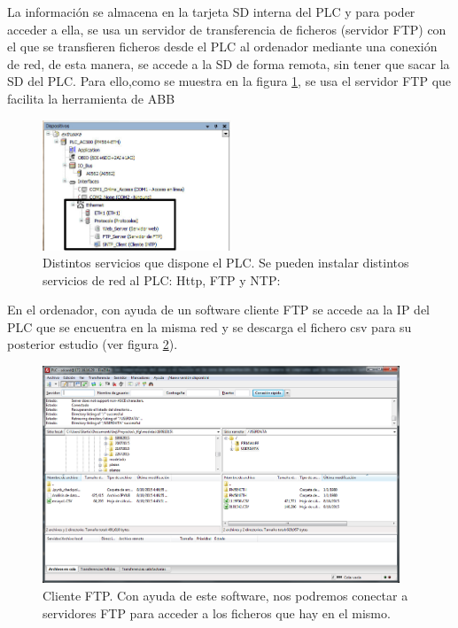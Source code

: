 La información se almacena en la tarjeta SD interna del PLC y para poder acceder a ella, se usa un servidor de transferencia de ficheros (servidor FTP) con el que se transfieren ficheros desde el PLC al ordenador mediante una conexión de red, de esta manera, se accede a la SD de forma remota, sin tener que sacar la SD del PLC. Para ello,como se muestra en la figura \ref{fig:plc_servicios}, se usa el servidor FTP que facilita la herramienta de ABB\\

\begin{figure}[H]
    \centering
    \includegraphics[width=0.5\textwidth]{images/PLC/servicios_plc.jpg}
    \caption[Distintos servicios que dispone el PLC]{Distintos servicios que dispone el PLC. Se pueden instalar distintos servicios de red al PLC: Http, FTP y NTP:}
    \label{fig:plc_servicios}
\end{figure}

En el ordenador, con ayuda de un software cliente FTP se accede aa la IP del PLC que se encuentra en la misma red y se descarga el fichero csv para su posterior estudio (ver figura \ref{fig:plc_cliente_ftp}).

\begin{figure}[H]
    \centering
    \includegraphics[width=0.95\textwidth]{images/PLC/cliente_ftp.png}
    \caption[Cliente FTP.]{Cliente FTP. Con ayuda de este software, nos podremos conectar a servidores FTP para acceder a los ficheros que hay en el mismo.}
    \label{fig:plc_cliente_ftp}
\end{figure}

